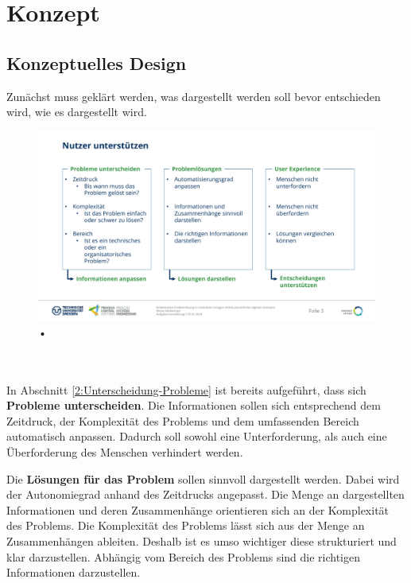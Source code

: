 \chapter{Konzept}
\label{sec:Konzept}

\section{Konzeptuelles Design}
Zunächst muss geklärt werden, was dargestellt werden soll bevor entschieden wird, wie es dargestellt wird. 
\begin{figure}[htbp]
\centering
\includegraphics[scale=0.45]{DA_files/Bilder/Konzept/Nutzer-unterstuetzen.pdf}
\caption{•}
\label{pic:Nutzer-Unterstuetzen}
\end{figure}
\\ \\
In Abschnitt \ref{2:Unterscheidung-Probleme} ist bereits aufgeführt, dass sich \textbf{Probleme unterscheiden}. Die Informationen sollen sich entsprechend dem Zeitdruck, der Komplexität des Problems und dem umfassenden Bereich automatisch anpassen. Dadurch soll sowohl eine Unterforderung, als auch eine Überforderung des Menschen verhindert werden.

Die \textbf{Lösungen für das Problem} sollen sinnvoll dargestellt werden. Dabei wird der Autonomiegrad anhand des Zeitdrucks angepasst. Die Menge an dargestellten Informationen und deren Zusammenhänge orientieren sich an der Komplexität des Problems. Die Komplexität des Problems lässt sich aus der Menge an Zusammenhängen ableiten. Deshalb ist es umso wichtiger diese strukturiert und klar darzustellen. Abhängig vom Bereich des Problems sind die richtigen Informationen darzustellen.

